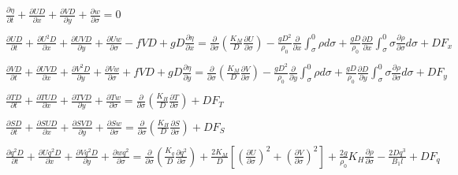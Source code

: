 \documentclass[oribibl]{llncs}
\begin{document}
\begin{eqnarray}
&&\frac{\partial \eta}{\partial t} + \frac{\partial UD}{\partial x}+ \frac{\partial VD}{\partial y}+ \frac{\partial w}{\partial \sigma}=0  \label{eq:final1}\\ 
\nonumber \\ 
&&\frac{\partial UD}{\partial t}  +\frac{\partial U^2D}{\partial x} +\frac{\partial UVD}{\partial y}+ \frac{\partial Uw}{\partial \sigma}-fVD+gD\frac{\partial \eta}{\partial x} = \frac{\partial}{\partial \sigma}\left( \frac{K_M}{D}\frac{\partial U}{\partial \sigma} \right) - \frac{gD^2}{\rho_0} \frac{\partial}{\partial x} \int_\sigma^0 \rho d \sigma + \frac{gD}{\rho_0}\frac{\partial D}{\partial x} \int_\sigma^0 \sigma \frac{\partial \rho}{\partial \sigma} d \sigma + DF_x  \label{eq:final2}\nonumber \\  
\\ 
&&\frac{\partial VD}{\partial t}  +\frac{\partial UVD}{\partial x} +\frac{\partial V^2D}{\partial y} + \frac{\partial Vw}{\partial \sigma} +fVD+gD\frac{\partial \eta}{\partial y} = \frac{\partial}{\partial \sigma}\left( \frac{K_M}{D}\frac{\partial V}{\partial \sigma} \right) - \frac{gD^2}{\rho_0} \frac{\partial}{\partial y} \int_\sigma^0 \rho d \sigma + \frac{gD}{\rho_0}\frac{\partial D}{\partial y} \int_\sigma^0 \sigma \frac{\partial \rho}{\partial \sigma} d \sigma + DF_y  \label{eq:final3}\nonumber \\  
\\  
&&\frac{\partial TD}{\partial t}+\frac{\partial TUD}{\partial x}+\frac{\partial TVD}{\partial y}+\frac{\partial Tw}{\partial \sigma} = \frac{\partial}{\partial \sigma}  \left ( \frac{K_H}{D} \frac{\partial T}{\partial \sigma} \right) +D F_T  \label{eq:final4}\\ 
\nonumber \\ 
&&\frac{\partial SD}{\partial t}+\frac{\partial SUD}{\partial x}+\frac{\partial SVD}{\partial y}+\frac{\partial Sw}{\partial \sigma} = \frac{\partial}{\partial \sigma}  \left ( \frac{K_H}{D} \frac{\partial S}{\partial \sigma} \right) +D F_S \label{eq:final5} \\ 
\nonumber \\ 
&&\frac{\partial q^2D}{\partial t} + \frac{\partial Uq^2D}{\partial x} +\frac{\partial Vq^2D}{\partial y} + \frac{\partial wq^2}{\partial \sigma}  = \frac{\partial}{\partial \sigma} \left( \frac{K_q}{D}  \frac{\partial q^2}{\partial \sigma} \right)+\frac{2K_M}{D}\left[ \left( \frac{\partial U}{\partial \sigma}\right)^2 + \left( \frac{\partial V}{\partial \sigma}\right)^2 \right] + \frac{2g}{\rho_0}K_H\frac{\partial \rho}{\partial \sigma} - \frac{2D q^3}{B_1 l} + D F_q  \label{eq:final6}\nonumber \\  

\end{eqnarray}
\end{document}
